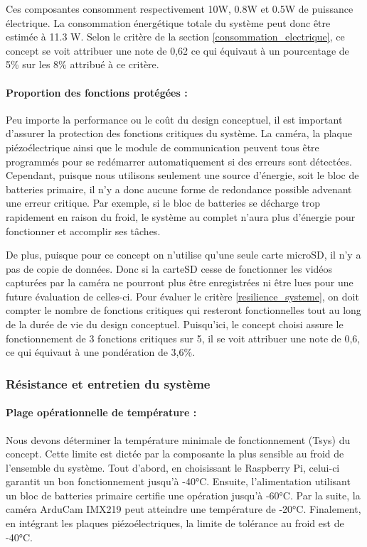 \bigskip
Ces composantes consomment respectivement 10W, 0.8W et 0.5W de puissance électrique. La consommation énergétique totale du système peut donc être estimée à 11.3 W. 
Selon le critère de la section \ref{consommation_electrique}, ce concept se voit attribuer une note de 0,62 ce qui équivaut à un pourcentage de 5\% sur les 8\% attribué à ce critère.


\paragraph{Proportion des fonctions protégées :}
Peu importe la performance ou le coût du design conceptuel, il est important d'assurer la protection des fonctions critiques du système. La caméra, la plaque piézoélectrique ainsi
que le module de communication peuvent tous être programmés pour se redémarrer automatiquement si des erreurs sont détectées.
Cependant, puisque nous utilisons seulement une source d'énergie, soit le bloc de batteries primaire, il n'y a donc aucune forme de redondance possible advenant une erreur critique. 
Par exemple, si le bloc de batteries se décharge trop rapidement en raison du froid, le système au complet n'aura plus d'énergie pour fonctionner et accomplir ses tâches.

\bigskip
De plus, puisque pour ce concept on n'utilise qu'une seule carte microSD, il n'y a pas de copie de données. Donc si la carteSD cesse de fonctionner les vidéos capturées par la caméra 
ne pourront plus être enregistrées ni être lues pour une future évaluation de celles-ci.
Pour évaluer le critère \ref{resilience_systeme}, on doit compter le nombre de fonctions critiques qui resteront fonctionnelles tout au long de la durée de vie du design conceptuel. 
Puisqu'ici, le concept choisi assure le fonctionnement de 3 fonctions critiques sur 5, il se voit attribuer une note de 0,6, ce qui équivaut à une pondération de 3,6\%.



\subsubsection{Résistance et entretien du système}

\paragraph{Plage opérationnelle de température :}
\label{plage_operationelle}
Nous devons déterminer la température minimale de fonctionnement (Tsys) du concept. Cette limite est dictée par la composante la plus sensible au froid de l'ensemble du système. 
Tout d'abord, en choisissant le Raspberry Pi, celui-ci garantit un bon fonctionnement jusqu'à -40°C. Ensuite, l'alimentation utilisant un bloc de batteries primaire certifie une opération jusqu'à -60°C. Par la suite, la caméra ArduCam IMX219 peut atteindre une température de -20°C. Finalement, en intégrant les plaques piézoélectriques, la limite de tolérance au froid est de -40°C.

